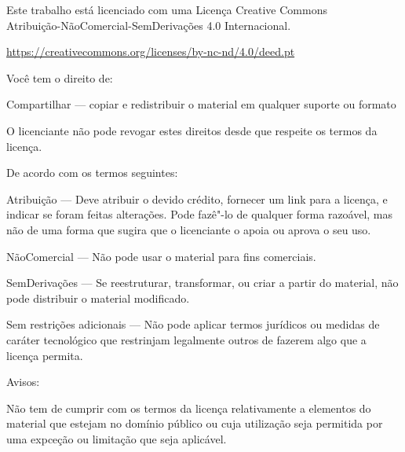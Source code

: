 \clearpage
\thispagestyle{empty}

{\fontsize{8}{12}\selectfont%
\setlength{\parindent}{0pt}%
\raggedright\label{copyright-details}%
\setlength{\parskip}{5pt}%

{\centering

{\LARGE\ccbyncnd}

Este trabalho está licenciado com uma Licença Creative Commons\\
Atribuição-NãoComercial-SemDerivações 4.0 Internacional.

\href{https://creativecommons.org/licenses/by-nc-nd/4.0/deed.pt}{https://creativecommons.org/licenses/by-nc-nd/4.0/deed.pt}

}

Você tem o direito de:

\begin{packeditemize}
\item Compartilhar — copiar e redistribuir o material em qualquer suporte ou formato
\end{packeditemize}

O licenciante não pode revogar estes direitos desde que respeite os termos da licença.

De acordo com os termos seguintes:

\begin{packeditemize}
\item Atribuição — Deve atribuir o devido crédito, fornecer um link para a licença, e indicar se foram feitas alterações. Pode fazê"-lo de qualquer forma razoável, mas não de uma forma que sugira que o licenciante o apoia ou aprova o seu uso.
\item NãoComercial — Não pode usar o material para fins comerciais.
\item SemDerivações — Se reestruturar, transformar, ou criar a partir do material, não pode distribuir o material modificado.
\end{packeditemize}

Sem restrições adicionais — Não pode aplicar termos jurídicos ou medidas de caráter tecnológico que restrinjam legalmente outros de fazerem algo que a licença permita.

\clearpage
\thispagestyle{empty}

Avisos:

Não tem de cumprir com os termos da licença relativamente a elementos do material que estejam no domínio público ou cuja utilização seja permitida por uma expceção ou limitação que seja aplicável.

}
